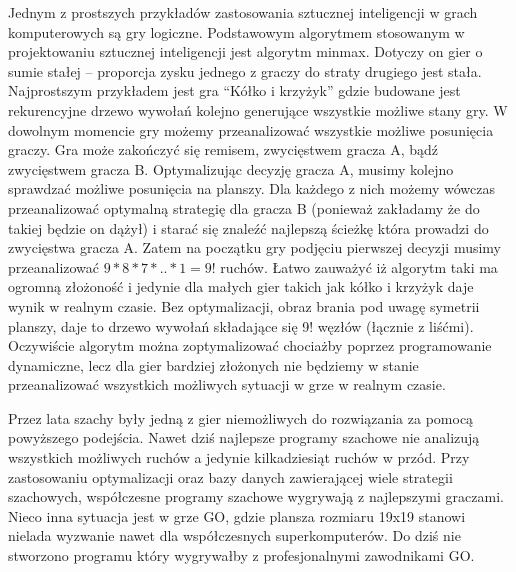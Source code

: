 \begin{par}
Jednym z prostszych przykładów zastosowania sztucznej inteligencji w grach komputerowych są gry logiczne. 
Podstawowym algorytmem stosowanym w projektowaniu sztucznej inteligencji jest algorytm minmax. Dotyczy on gier o sumie stałej -- proporcja zysku jednego z graczy do straty drugiego jest stała. 
Najprostszym przykładem jest gra ``Kółko i krzyżyk'' gdzie budowane jest rekurencyjne drzewo wywołań kolejno generujące wszystkie możliwe stany gry. 
W dowolnym momencie gry możemy przeanalizować wszystkie możliwe posunięcia graczy. Gra może zakończyć się remisem, zwycięstwem gracza A, bądź zwycięstwem gracza B.
Optymalizując decyzję gracza A, musimy kolejno sprawdzać możliwe posunięcia na planszy. Dla każdego z nich możemy wówczas przeanalizować optymalną strategię dla gracza B (ponieważ zakładamy że do takiej będzie on dążył) i starać się znaleźć najlepszą ścieżkę która prowadzi do zwycięstwa gracza A.
Zatem na początku gry podjęciu pierwszej decyzji musimy przeanalizować $9*8*7*..*1 = 9!$ ruchów.
Łatwo zauważyć iż algorytm taki ma ogromną złożoność i jedynie dla małych gier takich jak kółko i krzyżyk daje wynik w realnym czasie.
Bez optymalizacji, obraz brania pod uwagę symetrii planszy, daje to drzewo wywołań składające się 9! węzłów (łącznie z liśćmi). 
Oczywiście algorytm można zoptymalizować chociażby poprzez programowanie dynamiczne, lecz dla gier bardziej złożonych nie będziemy w stanie przeanalizować wszystkich możliwych sytuacji w grze w realnym czasie.
\end{par}
\begin{par}
Przez lata szachy były jedną z gier niemożliwych do rozwiązania za pomocą powyższego podejścia.
Nawet dziś najlepsze programy szachowe nie analizują wszystkich możliwych ruchów a jedynie kilkadziesiąt ruchów w przód.
Przy zastosowaniu optymalizacji oraz bazy danych zawierającej wiele strategii szachowych, współczesne programy szachowe wygrywają z najlepszymi graczami.
Nieco inna sytuacja jest w grze GO, gdzie plansza rozmiaru 19x19 stanowi nielada wyzwanie nawet dla współczesnych superkomputerów. 
Do dziś nie stworzono programu który wygrywałby z profesjonalnymi zawodnikami GO.
\end{par}
